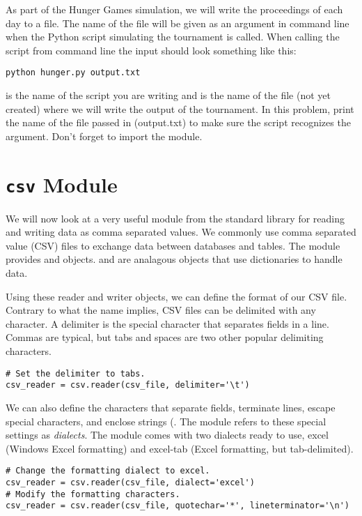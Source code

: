 \begin{problem}
As part of the Hunger Games simulation, we will write the proceedings of each day to a file. The name of the file will be given as an argument in command line when the Python script simulating the tournament is called. When calling the script from command line the input should look something like this:

\begin{lstlisting}[style=ShellOutput]
python hunger.py output.txt
\end{lstlisting}

 is the name of the script you are writing and  is the name of the file (not yet created) where we will write the output of the tournament. In this problem, print the name of the file passed in (output.txt) to make sure the script recognizes the argument. Don't forget to import the  module.

\end{problem}


\section*{\texttt{csv} Module}
We will now look at a very useful module from the standard library for reading and writing data as comma separated values. We commonly use comma separated value (CSV) files to exchange data between databases and tables.
The  module provides  and  objects.  and  are analagous objects that use dictionaries to handle data.

Using these reader and writer objects, we can define the format of our CSV file.
Contrary to what the name implies, CSV files can be delimited with any character.
A delimiter is the special character that separates fields in a line. Commas are typical, but tabs and spaces are two other popular delimiting characters.
\begin{lstlisting}
# Set the delimiter to tabs.
csv_reader = csv.reader(csv_file, delimiter='\t')
\end{lstlisting}

We can also define the characters that separate fields, terminate lines, escape special characters, and enclose strings (.
The  module refers to these special settings as \emph{dialects}.
The module comes with two dialects ready to use, excel (Windows Excel formatting) and excel-tab (Excel formatting, but tab-delimited).
\begin{lstlisting}
# Change the formatting dialect to excel.
csv_reader = csv.reader(csv_file, dialect='excel')
# Modify the formatting characters.
csv_reader = csv.reader(csv_file, quotechar='*', lineterminator='\n')

\end{lstlisting}

